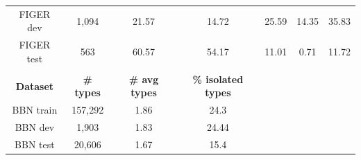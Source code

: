 \begin{table}
{\begin{tabular}{cccclll}
\multicolumn{1}{|c|}{FIGER dev}        & 1,094                                  & 21.57                                           & 14.72                                                                                              & \multicolumn{1}{c}{25.59}                   & \multicolumn{1}{c}{14.35}                   & \multicolumn{1}{c|}{35.83}                        \\
\multicolumn{1}{|c|}{FIGER test}       & 563                                    & 60.57                                           & 54.17                                                                                              & \multicolumn{1}{c}{11.01}                   & \multicolumn{1}{c}{0.71}                    & \multicolumn{1}{c|}{11.72}                        \\ \hline
\multicolumn{1}{l}{}                   & \multicolumn{1}{l}{}                   & \multicolumn{1}{l}{}                            & \multicolumn{1}{l}{}                                                                               &                                             &                                             &                                                   \\ \cline{1-4}
\multicolumn{1}{|c|}{\textbf{Dataset}} & \multicolumn{1}{c|}{\textbf{\# types}} & \multicolumn{1}{c|}{\textbf{\# avg types}}      & \multicolumn{1}{c|}{\textbf{\% isolated types}}                                                    &                                             &                                             &                                                   \\ \cline{1-4}
\multicolumn{1}{|c|}{BBN train}        & 157,292                                & 1.86                                            & \multicolumn{1}{c|}{24.3}                                                                          &                                             &                                             &                                                   \\
\multicolumn{1}{|c|}{BBN dev}          & 1,903                                  & 1.83                                            & \multicolumn{1}{c|}{24.44}                                                                         &                                             &                                             &                                                   \\
\multicolumn{1}{|c|}{BBN test}         & 20,606                                 & 1.67                                            & \multicolumn{1}{c|}{15.4}                                                                          &                                             &                                             &                                                   \\ \cline{1-4}

\end{tabular}}
\end{table}
